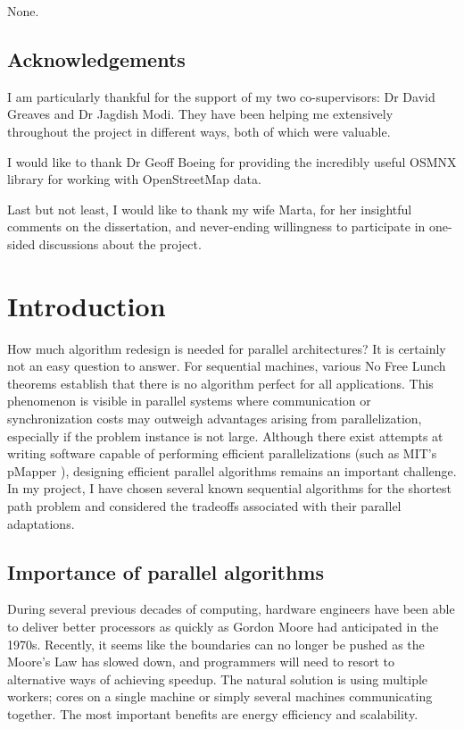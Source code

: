\documentclass[12pt,a4paper,twoside,openright]{report}
\begin{document}
None.

\newpage
\section*{Acknowledgements}

I am particularly thankful for the support of my two co-supervisors: Dr David Greaves and Dr Jagdish Modi. They have been helping me extensively throughout the project in different ways, both of which were valuable.

I would like to thank Dr Geoff Boeing for providing the incredibly useful OSMNX library for working with OpenStreetMap data\cite{Boeing2017}.

Last but not least, I would like to thank my wife Marta, for her insightful comments on the dissertation, and never-ending willingness to participate in one-sided discussions about the project.

\tableofcontents

\pagestyle{headings}
\chapter{Introduction}
How much algorithm redesign is needed for parallel architectures? It is certainly not an easy question to answer. For sequential machines, various No Free Lunch theorems \cite{free-lunch} establish that there is no algorithm perfect for all applications. This phenomenon is  visible in parallel systems where communication or synchronization costs may outweigh advantages arising from parallelization, especially if the problem instance is not large. Although there exist attempts at writing software capable of performing efficient parallelizations (such as MIT's pMapper \cite{pmapper}), designing efficient parallel algorithms remains an important challenge. In my project, I have chosen several known sequential algorithms for the shortest path problem and considered the tradeoffs associated with their parallel adaptations.
\section{Importance of parallel algorithms}
During several previous decades of computing, hardware engineers have been able to deliver better processors as quickly as Gordon Moore had anticipated in the 1970s. Recently, it seems like the boundaries can no longer be pushed as the Moore's Law has slowed down\cite{moore-law}, and programmers will need to resort to alternative ways of achieving speedup. The natural solution is using multiple workers; cores on a single machine or simply several machines communicating together. The most important benefits are energy efficiency and scalability. 
\end{document}
